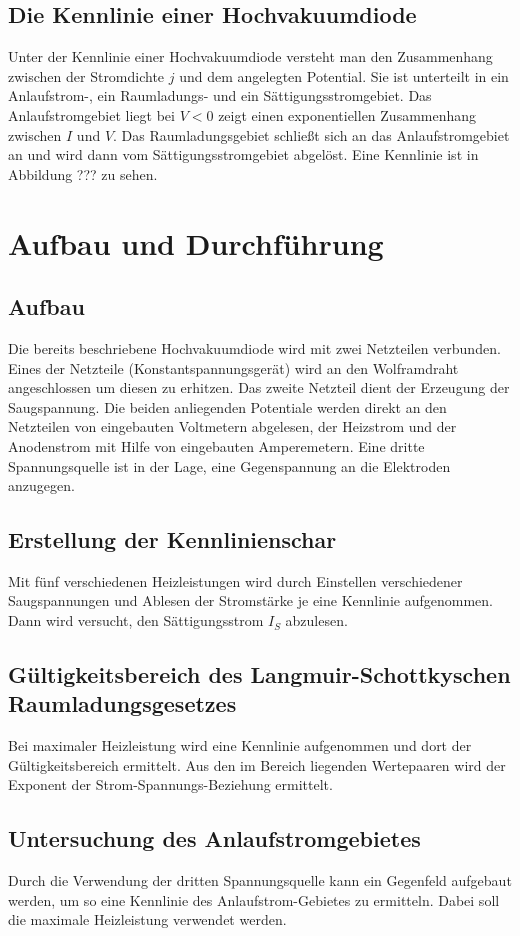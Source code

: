 \documentclass[11pt,ngerman,a4paper]{article}
\begin{document}
\subsection{Die Kennlinie einer Hochvakuumdiode}
Unter der Kennlinie einer Hochvakuumdiode versteht man den Zusammenhang zwischen der Stromdichte $j$ und dem angelegten Potential. Sie ist unterteilt in ein Anlaufstrom-, ein Raumladungs- und ein Sättigungsstromgebiet. Das Anlaufstromgebiet liegt bei $V < 0$ zeigt einen exponentiellen Zusammenhang zwischen $I$ und $V$. Das Raumladungsgebiet schließt sich an das Anlaufstromgebiet an und wird dann vom Sättigungsstromgebiet abgelöst. Eine Kennlinie ist in Abbildung ??? zu sehen.
\section{Aufbau und Durchführung}
\subsection{Aufbau}
Die bereits beschriebene Hochvakuumdiode wird mit zwei Netzteilen verbunden. Eines der Netzteile (Konstantspannungsgerät) wird an den Wolframdraht angeschlossen um diesen zu erhitzen. Das zweite Netzteil dient der Erzeugung der Saugspannung. Die beiden anliegenden Potentiale werden direkt an den Netzteilen von eingebauten Voltmetern abgelesen, der Heizstrom und der Anodenstrom mit Hilfe von eingebauten Amperemetern. Eine dritte Spannungsquelle ist in der Lage, eine Gegenspannung an die Elektroden anzugegen.
\subsection{Erstellung der Kennlinienschar}
Mit fünf verschiedenen Heizleistungen wird durch Einstellen verschiedener Saugspannungen und Ablesen der Stromstärke je eine Kennlinie aufgenommen. Dann wird versucht, den Sättigungsstrom $I_S$ abzulesen.
\subsection{Gültigkeitsbereich des Langmuir-Schottkyschen Raumladungsgesetzes}
Bei maximaler Heizleistung wird eine Kennlinie aufgenommen und dort der Gültigkeitsbereich ermittelt. Aus den im Bereich liegenden Wertepaaren wird der Exponent der Strom-Spannungs-Beziehung ermittelt.
\subsection{Untersuchung des Anlaufstromgebietes}
Durch die Verwendung der dritten Spannungsquelle kann ein Gegenfeld aufgebaut werden, um so eine Kennlinie des Anlaufstrom-Gebietes zu ermitteln. Dabei soll die maximale Heizleistung verwendet werden.
\end{document}
